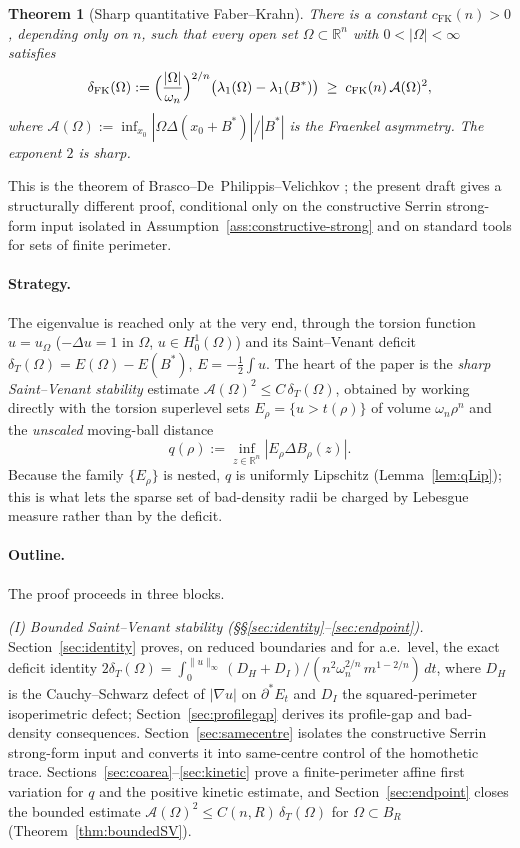 \documentclass[11pt]{amsart}
\newtheorem{theorem}{Theorem}[section]
\theoremstyle{definition}
\newcommand{\R}{\mathbb R}
\newcommand{\Om}{\Omega}
\newcommand{\Fr}{\mathcal A}
\newcommand{\dT}{\delta_T}
\newcommand{\Bstar}{B^*}
\newcommand{\deltaFK}{\delta_{\mathrm{FK}}}
\begin{document}
\begin{theorem}[Sharp quantitative Faber--Krahn]\label{thm:FK-main}
There is a constant \(c_{\mathrm{FK}}(n)>0\), depending only on \(n\), such that
every open set \(\Om\subset\R^n\) with \(0<|\Om|<\infty\) satisfies
\[
   \deltaFK(\Om):=
   \Bigl(\frac{|\Om|}{\omega_n}\Bigr)^{2/n}
   \bigl(\lambda_1(\Om)-\lambda_1(\Bstar)\bigr)
   \;\ge\; c_{\mathrm{FK}}(n)\,\Fr(\Om)^2,
\]
where \(\Fr(\Om):=\inf_{x_0}|\Om\Delta(x_0+\Bstar)|/|\Bstar|\) is the Fraenkel
asymmetry.  The exponent \(2\) is sharp.
\end{theorem}

This is the theorem of Brasco--De~Philippis--Velichkov \cite{BDV}; the present
draft gives a structurally different proof, conditional only on the constructive
Serrin strong-form input isolated in Assumption~\ref{ass:constructive-strong}
and on standard tools for sets of finite perimeter.

\paragraph{Strategy.} The eigenvalue is reached only at the very end, through
the torsion function \(u=u_\Om\) (\(-\Delta u=1\) in \(\Om\), \(u\in
H^1_0(\Om)\)) and its Saint--Venant deficit
\(\dT(\Om)=E(\Om)-E(\Bstar)\), \(E=-\tfrac12\int u\).  The heart of the paper is
the \emph{sharp Saint--Venant stability} estimate
\(\Fr(\Om)^2\le C\,\dT(\Om)\), obtained by working directly with the torsion
superlevel sets \(E_\rho=\{u>t(\rho)\}\) of volume \(\omega_n\rho^n\) and the
\emph{unscaled} moving-ball distance
\[
   q(\rho):=\inf_{z\in\R^n}|E_\rho\Delta B_\rho(z)| .
\]
Because the family \(\{E_\rho\}\) is nested, \(q\) is uniformly Lipschitz
(Lemma~\ref{lem:qLip}); this is what lets the sparse set of bad-density radii be
charged by Lebesgue measure rather than by the deficit.

\paragraph{Outline.} The proof proceeds in three blocks.

\emph{(I) Bounded Saint--Venant stability
(\S\S\ref{sec:identity}--\ref{sec:endpoint}).}
Section~\ref{sec:identity} proves, on reduced boundaries and for a.e.\ level, the
exact deficit identity
\(2\dT(\Om)=\int_0^{\|u\|_\infty}(D_H+D_I)/(n^2\omega_n^{2/n}\,m^{1-2/n})\,dt\),
where \(D_H\) is the Cauchy--Schwarz defect of \(|\nabla u|\) on
\(\partial^*E_t\) and \(D_I\) the squared-perimeter isoperimetric defect;
Section~\ref{sec:profilegap} derives its profile-gap and bad-density
consequences.  Section~\ref{sec:samecentre} isolates the constructive Serrin
strong-form input and converts it into same-centre control of the homothetic
trace.
Sections~\ref{sec:coarea}--\ref{sec:kinetic} prove a finite-perimeter affine
first variation for \(q\) and the positive kinetic estimate, and
Section~\ref{sec:endpoint} closes the bounded estimate
\(\Fr(\Om)^2\le C(n,R)\,\dT(\Om)\) for \(\Om\subset B_R\)
(Theorem~\ref{thm:boundedSV}).
\end{document}
